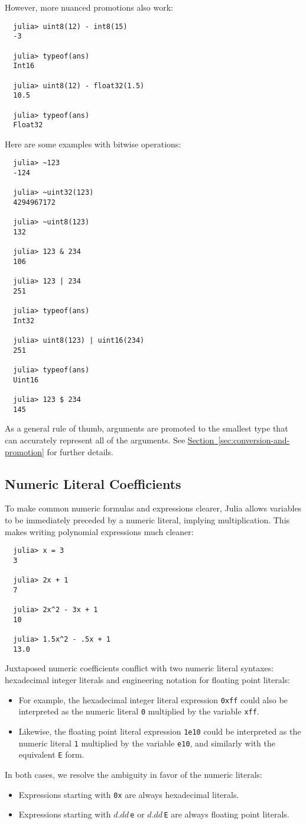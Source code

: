 \documentclass{article}
\newcommand{\Section}[1]{\hyperref[sec:#1]{Section~\ref*{sec:#1}}}
\begin{document}
However, more nuanced promotions also work:
\begin{verbatim}
  julia> uint8(12) - int8(15)
  -3

  julia> typeof(ans)
  Int16

  julia> uint8(12) - float32(1.5)
  10.5

  julia> typeof(ans)
  Float32
\end{verbatim}
Here are some examples with bitwise operations:
\begin{verbatim}
  julia> ~123
  -124

  julia> ~uint32(123)
  4294967172

  julia> ~uint8(123)
  132

  julia> 123 & 234
  106

  julia> 123 | 234
  251

  julia> typeof(ans)
  Int32

  julia> uint8(123) | uint16(234)
  251

  julia> typeof(ans)
  Uint16

  julia> 123 $ 234
  145
\end{verbatim}
As a general rule of thumb, arguments are promoted to the smallest type that can accurately represent all of the arguments. See \Section{conversion-and-promotion} for further details.

\subsection{Numeric Literal Coefficients}

To make common numeric formulas and expressions clearer, Julia allows variables to be immediately preceded by a numeric literal, implying multiplication.
This makes writing polynomial expressions much cleaner:
\begin{verbatim}
  julia> x = 3
  3

  julia> 2x + 1
  7

  julia> 2x^2 - 3x + 1
  10

  julia> 1.5x^2 - .5x + 1
  13.0
\end{verbatim}
Juxtaposed numeric coefficients conflict with two numeric literal syntaxes:
hexadecimal integer literals and engineering notation for floating point literals:
\begin{itemize}
\item For example, the hexadecimal integer literal expression \verb|0xff| could also be interpreted as the numeric literal \verb|0| multiplied by the variable \verb|xff|.
\item Likewise, the floating point literal expression \verb|1e10| could be interpreted as the numeric literal \verb|1| multiplied by the variable \verb|e10|, and similarly with the equivalent \verb|E| form.
\end{itemize}
In both cases, we resolve the ambiguity in favor of the numeric literals:
\begin{itemize}
\item Expressions starting with \verb|0x| are always hexadecimal literals.
\item Expressions starting with $d.dd$\,\verb|e| or $d.dd$\,\verb|E| are always floating point literals.
\end{itemize}
\end{document}

